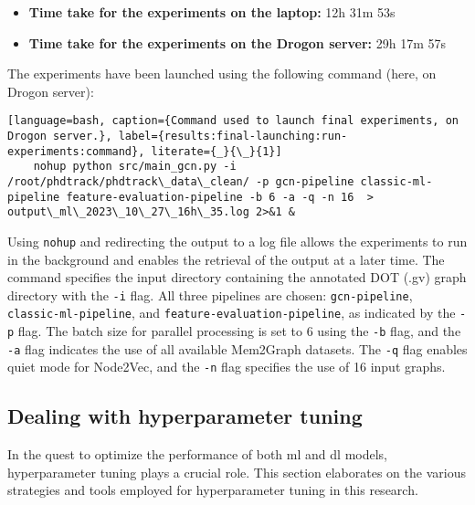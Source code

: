 \begin{itemize}
    \item \textbf{Time take for the experiments on the laptop:} 12h 31m 53s
    \item \textbf{Time take for the experiments on the Drogon server:} 29h 17m 57s
\end{itemize}

The experiments have been launched using the following command (here, on Drogon server):

\begin{lstlisting}[language=bash, caption={Command used to launch final experiments, on Drogon server.}, label={results:final-launching:run-experiments:command}, literate={_}{\_}{1}]
    nohup python src/main_gcn.py -i /root/phdtrack/phdtrack\_data\_clean/ -p gcn-pipeline classic-ml-pipeline feature-evaluation-pipeline -b 6 -a -q -n 16  > output\_ml\_2023\_10\_27\_16h\_35.log 2>&1 &
\end{lstlisting}
    

Using \texttt{nohup} and redirecting the output to a log file allows the experiments to run in the background and enables the retrieval of the output at a later time. The command specifies the input directory containing the annotated DOT (.gv) graph directory with the \texttt{-i} flag. All three pipelines are chosen: \texttt{gcn-pipeline}, \texttt{classic-ml-pipeline}, and \texttt{feature-evaluation-pipeline}, as indicated by the \texttt{-p} flag. The batch size for parallel processing is set to 6 using the \texttt{-b} flag, and the \texttt{-a} flag indicates the use of all available Mem2Graph datasets. The \texttt{-q} flag enables quiet mode for Node2Vec, and the \texttt{-n} flag specifies the use of 16 input graphs.

\subsection{Dealing with hyperparameter tuning}

In the quest to optimize the performance of both \acrshort{ml} and \acrshort{dl} models, hyperparameter tuning plays a crucial role. This section elaborates on the various strategies and tools employed for hyperparameter tuning in this research.

